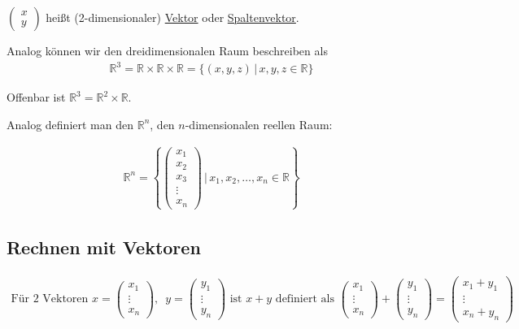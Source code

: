 $\begin{pmatrix}x \\ y\end{pmatrix}$ heißt (2-dimensionaler) \underline{Vektor} oder \underline{Spaltenvektor}.

Analog können wir den dreidimensionalen Raum beschreiben als
\begin{align*}
	\mathbb{R}^3 = \mathbb{R} \times \mathbb{R} \times \mathbb{R} = \{(x,y,z)\,|\,x,y,z \in \mathbb{R}\}
\end{align*}

Offenbar ist $\mathbb{R}^3 = \mathbb{R}^2 \times \mathbb{R}$.

Analog definiert man den $\mathbb{R}^n$, den $n$-dimensionalen reellen Raum:

\begin{align*}
	\mathbb{R}^n = \left\{\begin{pmatrix}x_1 \\ x_2 \\ x_3 \\ \vdots \\ x_n \end{pmatrix}\,\Bigg|\, x_1, x_2, \dots, x_n \in \mathbb{R} \right\}
\end{align*}

\subsection{Rechnen mit Vektoren}
\begin{align*}
	\text{Für 2 Vektoren }x = \begin{pmatrix}x_1 \\ \vdots \\ x_n \end{pmatrix},\enspace y = \begin{pmatrix}y_1 \\ \vdots \\ y_n \end{pmatrix}\text{ ist } x + y\text{ definiert als }\begin{pmatrix}x_1 \\ \vdots \\ x_n \end{pmatrix} + \begin{pmatrix}y_1 \\ \vdots \\ y_n \end{pmatrix} = \begin{pmatrix}x_1 + y_1 \\ \vdots \\ x_n + y_n \end{pmatrix}
\end{align*}

